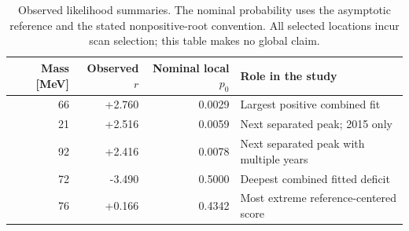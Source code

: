 \begin{table}[H]\centering\small
\begin{tabular}{rrrl}\toprule
Mass [MeV] & Observed $r$ & Nominal local $p_0$ & Role in the study\\\midrule
66 & +2.760 & 0.0029 & Largest positive combined fit\\
21 & +2.516 & 0.0059 & Next separated peak; 2015 only\\
92 & +2.416 & 0.0078 & Next separated peak with multiple years\\
72 & -3.490 & 0.5000 & Deepest combined fitted deficit\\
76 & +0.166 & 0.4342 & Most extreme reference-centered score\\
\bottomrule\end{tabular}
\caption{Observed likelihood summaries. The nominal probability uses the asymptotic reference and the stated nonpositive-root convention. All selected locations incur scan selection; this table makes no global claim.}\end{table}
